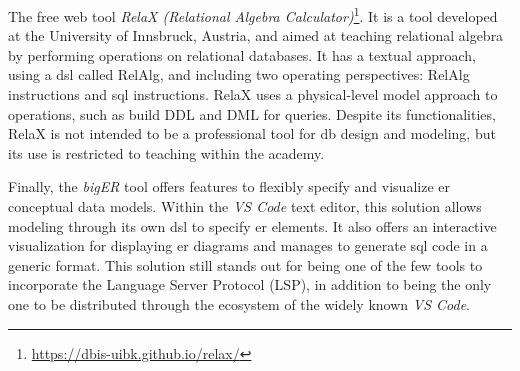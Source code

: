 The free web tool \textit{RelaX (Relational Algebra Calculator)}\footnote{\url{https://dbis-uibk.github.io/relax/}}.
It is a tool developed at the University of Innsbruck, Austria, and aimed at teaching relational algebra by performing operations on relational databases.
It has a textual approach, using a \ac{dsl} called RelAlg, and including two operating perspectives: RelAlg instructions and \ac{sql} instructions.
RelaX uses a physical-level model approach to operations, such as build DDL and DML for queries.
Despite its functionalities, RelaX is not intended to be a professional tool for \ac{db} design and modeling, but its use is restricted to teaching within the academy.

Finally, the \textit{bigER} tool offers features to flexibly specify and visualize \ac{er} conceptual data models.
Within the \textit{VS Code} text editor, this solution allows modeling through its own \ac{dsl} to specify \ac{er} elements.
It also offers an interactive visualization for displaying \ac{er} diagrams and manages to generate \ac{sql} code in a generic format.
This solution still stands out for being one of the few tools to incorporate the Language Server Protocol (LSP), in addition to being the only one to be distributed through the ecosystem of the widely known \textit{VS Code}.

